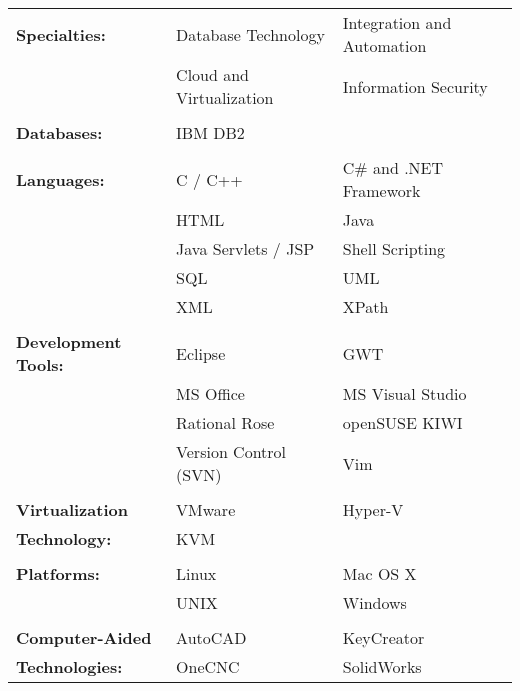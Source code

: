 \documentclass[margin,line]{resume}
\begin{document}
\begin{resume}
\begin{tabular}{@{}p{1.75in}p{1.75in}p{1.75in}}
\textbf{Specialties:}			&	Database Technology		&	Integration and Automation	\\
					&	Cloud and Virtualization	&	Information Security		\\
\\
\textbf{Databases:}			&	IBM DB2				&					\\
\\
\textbf{Languages:}			&	C / C++				&	C\# and .NET Framework		\\
					&	HTML				&	Java				\\
					&	Java Servlets / JSP		&	Shell Scripting			\\
					&	SQL				&	UML				\\
					&	XML				&	XPath				\\
\\
\textbf{Development Tools:}		&	Eclipse				&	GWT				\\
					&	MS Office			&	MS Visual Studio		\\
					&	Rational Rose			&	openSUSE KIWI			\\
					&	Version Control (SVN)		&	Vim				\\
\\
\textbf{Virtualization }		&	VMware				&	Hyper-V				\\
\textbf{Technology:}			&	KVM				&					\\
\\
\textbf{Platforms:}			&	Linux				&	Mac OS X			\\
					&	UNIX				&	Windows				\\
\\
\textbf{Computer-Aided }		&	AutoCAD				&	KeyCreator			\\
\textbf{Technologies:}			&	OneCNC				&	SolidWorks			\\
\end{tabular}

%

\end{resume}
\end{document}

